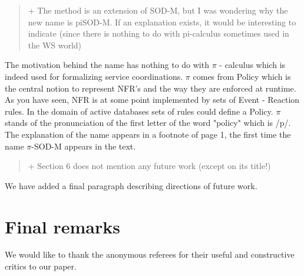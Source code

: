 \documentclass[12pt,a4wide]{article}
\begin{document}
\begin{quotation}\sf\footnotesize

+ The method is an extension of SOD-M, but I was wondering why the new name is piSOD-M. If an explanation exists, it would be interesting to indicate (since there is nothing to do with pi-calculus sometimes used in the WS world) 
\end{quotation}

\noindent 
The motivation behind the name has nothing to do with $\pi$ - calculus which is indeed used for formalizing service coordinations. $\pi$ comes from Policy which is the central notion to represent  NFR's and the way they are enforced at runtime. As you have seen, NFR is at some point implemented by sets of Event - Reaction rules. In the domain of active databases sets of rules could define a Policy. $\pi$ stands of the pronunciation of the first letter of the word "policy" which is /p/. The explanation of the name appears in a footnote of page 1, the first time the name $\pi$-SOD-M appears in the text. 


\begin{quotation}\sf\footnotesize

+ Section 6 does not mention any future work (except on its title!) 

\end{quotation}

\noindent 
We have added a final paragraph describing directions of future work.



\section*{Final remarks}

We would like to thank the anonymous referees for their useful and constructive critics to our paper.


  
\end{document}

